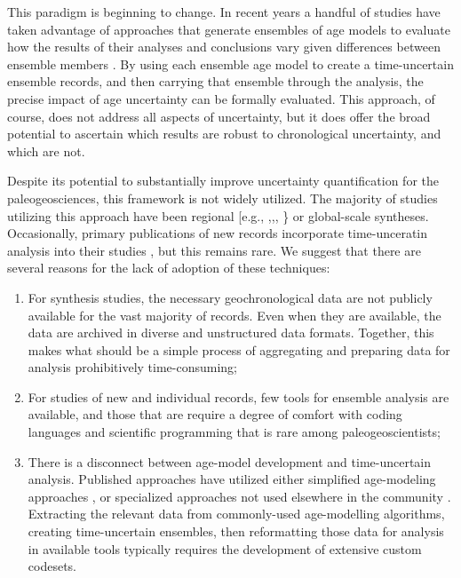 \documentclass[gc, manuscript]{copernicus}
\begin{document}
This paradigm is beginning to change. In recent years a handful of
studies have taken advantage of approaches that generate ensembles of
age models to evaluate how the results of their analyses and conclusions
vary given differences between ensemble members
\citep{Haam_Huybers2010,Rhines_JGR2011,Anchukaitis_Tierney2012,Shakun_Nature2012,Marcott_Science2013, Tierney2013}.
By using each ensemble age model to create a time-uncertain ensemble
records, and then carrying that ensemble through the analysis, the
precise impact of age uncertainty can be formally evaluated. This
approach, of course, does not address all aspects of uncertainty, but it
does offer the broad potential to ascertain which results are robust to
chronological uncertainty, and which are not.

Despite its potential to substantially improve uncertainty
quantification for the paleogeosciences, this framework is not widely
utilized. The majority of studies utilizing this approach have been
regional {[}e.g.,
\citet{Anchukaitis_Tierney2012},\citet{Tierney2013},\citet{mckay_onset_2018},
\citet{routson2018}\} or global-scale
\citep[e.g.,][\citet{Marcott_Science2013},\citet{kaufman2020HoloceneGMST}]{Shakun_Nature2012}
syntheses. Occasionally, primary publications of new records incorporate
time-unceratin analysis into their studies \citep[more]{Boldt2015}, but
this remains rare. We suggest that there are several reasons for the
lack of adoption of these techniques:

\begin{enumerate}
\def\labelenumi{\arabic{enumi}.}
\tightlist
\item
  For synthesis studies, the necessary geochronological data are not
  publicly available for the vast majority of records. Even when they
  are available, the data are archived in diverse and unstructured data
  formats. Together, this makes what should be a simple process of
  aggregating and preparing data for analysis prohibitively
  time-consuming;
\item
  For studies of new and individual records, few tools for ensemble
  analysis are available, and those that are require a degree of comfort
  with coding languages and scientific programming that is rare among
  paleogeoscientists;
\item
  There is a disconnect between age-model development and time-uncertain
  analysis. Published approaches have utilized either simplified
  age-modeling approaches \citep{Haam_Huybers2010}, or specialized
  approaches not used elsewhere in the community
  \citep[\citet{Anchukaitis_Tierney2012},\citet{Marcott_Science2013},\citet{Tierney2013},\citet{Routson2018}]{Shakun_Nature2012}.
  Extracting the relevant data from commonly-used age-modelling
  algorithms, creating time-uncertain ensembles, then reformatting those
  data for analysis in available tools typically requires the
  development of extensive custom codesets.
\end{enumerate}
\end{document}
